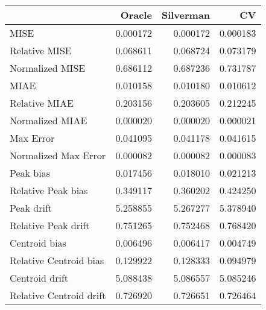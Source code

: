 \begin{tabular}{lrrr}
  \hline
 & Oracle & Silverman & CV \\ 
  \hline
MISE & 0.000172 & 0.000172 & 0.000183 \\ 
  Relative MISE & 0.068611 & 0.068724 & 0.073179 \\ 
  Normalized MISE & 0.686112 & 0.687236 & 0.731787 \\ 
  MIAE & 0.010158 & 0.010180 & 0.010612 \\ 
  Relative MIAE & 0.203156 & 0.203605 & 0.212245 \\ 
  Normalized MIAE & 0.000020 & 0.000020 & 0.000021 \\ 
  Max Error & 0.041095 & 0.041178 & 0.041615 \\ 
  Normalized Max Error & 0.000082 & 0.000082 & 0.000083 \\ 
  Peak bias & 0.017456 & 0.018010 & 0.021213 \\ 
  Relative Peak bias & 0.349117 & 0.360202 & 0.424250 \\ 
  Peak drift & 5.258855 & 5.267277 & 5.378940 \\ 
  Relative Peak drift & 0.751265 & 0.752468 & 0.768420 \\ 
  Centroid bias & 0.006496 & 0.006417 & 0.004749 \\ 
  Relative Centroid bias & 0.129922 & 0.128333 & 0.094979 \\ 
  Centroid drift & 5.088438 & 5.086557 & 5.085246 \\ 
  Relative Centroid drift & 0.726920 & 0.726651 & 0.726464 \\ 
   \hline
\end{tabular}
